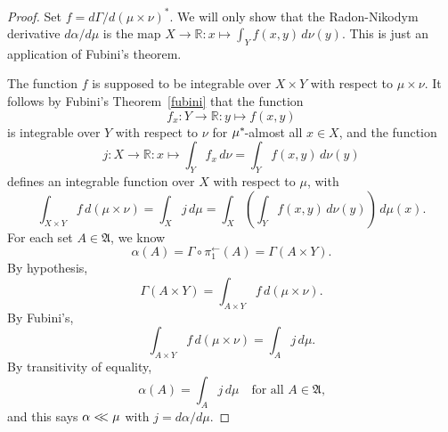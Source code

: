 \documentclass[
twoside=true,
paper=letter,
fontsize=9pt,
pagesize=auto,
leqno,
openany,
headsepline,
overfullrule,
]{scrbook}
\theoremstyle{plain}
\theoremstyle{plain}
\theoremstyle{definition}
\theoremstyle{bfnoteitalic}
\theoremstyle{bfnoteroman}
\newcommand{\sigalg}[1]{\mathfrak{#1}}
\newcommand{\preimage}[1]{#1^{\leftarrow}}
\newcommand{\R}{\mathbb{R}}
\newcommand{\sigmaalgebra}{\sigalg{A}}
\newcommand{\kernast}{\ast\kern-1pt}
\newcommand{\funcj}{j}
\newcommand{\function}{f}
\newcommand{\measurespace}{X}
\newcommand{\measurespaceii}{Y}
\newcommand{\mspaceelt}{x}
\newcommand{\mspaceeltii}{y}
\newcommand{\abscont}{\mathrel{< \kern-3.5pt <}}
\newcommand{\measure}{\mu}
\newcommand{\measureii}{\nu}
\newcommand{\seti}{A}
\newcommand{\projectionone}{\pi_1}
\newcommand{\pspace}{\measurespace}%
\newcommand{\sspace}{\measurespaceii}%
\newcommand{\measonprod}{\Gamma}%
\newcommand{\marginalone}{\alpha}%
\begin{document}
\begin{proof}
Set
$\function = d\measonprod / d(\measure\times\measureii)^*$.
We will only show that the Radon-Nikodym derivative
$d \marginalone / d \measure$
is the map
$\measurespace\to\R:
\mspaceelt\mapsto
\int_{\measurespaceii}\function(\mspaceelt,\mspaceeltii)\,d\measureii(\mspaceeltii)$.
This is just an application of Fubini's theorem.

The function $\function$ is supposed to be integrable over $\pspace\times\sspace$ with respect to 
$\measure\times\measureii$. It follows by
Fubini's Theorem~\ref{fubini} that
the function
\[
\function_\mspaceelt : 
\measurespaceii \to\R
: \mspaceeltii \mapsto \function(\mspaceelt,\mspaceeltii)
\]
is integrable over $\measurespaceii$ with respect to $\measureii$
 for
$\measure^\kernast$-almost all 
$\mspaceelt\in\measurespace$, 
and the function
\[
\funcj :\measurespace\to\R :\mspaceelt\mapsto
\int_\measurespaceii\function_\mspaceelt\,d\measureii
=
\int_{\measurespaceii}\function(\mspaceelt,\mspaceeltii) \, d\measureii(\mspaceeltii)
\]
defines an integrable function over $\measurespace$ with respect to 
$\measure$, with
\[
\int_{\measurespace\times\measurespaceii} 
\function \, d (\measure\times\measureii)
=
\int_\measurespace \funcj \,d \measure
=
\int_\measurespace
\left(
\int_\measurespaceii
\function(\mspaceelt,\mspaceeltii) 
\, d\measureii(\mspaceeltii)
\right) \, d\measure(\mspaceelt).
\]
For each set $\seti\in\sigmaalgebra$,
we know 
\[
\marginalone(\seti) 
= \measonprod\circ\preimage{\projectionone}(\seti)
= \measonprod(\seti\times\measurespaceii).
\]
By hypothesis, 
\[
\measonprod(\seti\times\measurespaceii)
=
\int_{\seti\times\measurespaceii} \function \, d(\measure\times\measureii).
\]
By Fubini's,
\[
\int_{\seti\times\measurespaceii} \function 
\, d(\measure\times\measureii)
= \int_{\seti} \funcj \,d\measure.
\]
By transitivity of equality, 
\[
\marginalone(\seti)
=
\int_{\seti} \funcj \,d\measure
\quad
\text{for all $\seti\in\sigmaalgebra$,}
\]
and this says $\marginalone\abscont \measure$ with
$\funcj = d\marginalone/d\measure$.
\end{proof}
\end{document}
